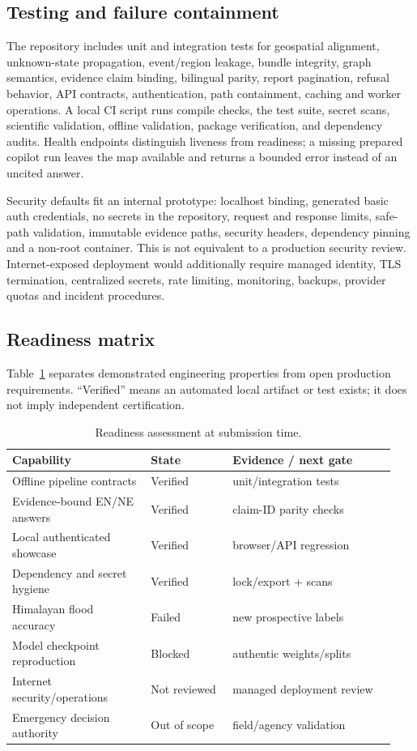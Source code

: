 \documentclass[10pt,twocolumn,letterpaper]{article}
\begin{document}
\subsection{Testing and failure containment}
The repository includes unit and integration tests for geospatial alignment,
unknown-state propagation, event/region leakage, bundle integrity, graph
semantics, evidence claim binding, bilingual parity, report pagination, refusal
behavior, API contracts, authentication, path containment, caching and worker
operations. A local CI script runs compile checks, the test suite, secret scans,
scientific validation, offline validation, package verification, and dependency
audits. Health endpoints distinguish liveness from readiness; a missing prepared
copilot run leaves the map available and returns a bounded error instead of an
uncited answer.

Security defaults fit an internal prototype: localhost binding, generated basic
auth credentials, no secrets in the repository, request and response limits,
safe-path validation, immutable evidence paths, security headers, dependency
pinning and a non-root container. This is not equivalent to a production security
review. Internet-exposed deployment would additionally require managed identity,
TLS termination, centralized secrets, rate limiting, monitoring, backups,
provider quotas and incident procedures.

\subsection{Readiness matrix}
Table~\ref{tab:readiness} separates demonstrated engineering properties from
open production requirements. ``Verified'' means an automated local artifact or
test exists; it does not imply independent certification.

\begin{table}[t]
\centering
\caption{Readiness assessment at submission time.}
\label{tab:readiness}
\small
\setlength{\tabcolsep}{3pt}
\begin{tabular}{@{}p{0.34\linewidth}p{0.20\linewidth}p{0.40\linewidth}@{}}
\toprule
Capability & State & Evidence / next gate \\
\midrule
Offline pipeline contracts & Verified & unit/integration tests \\
Evidence-bound EN/NE answers & Verified & claim-ID parity checks \\
Local authenticated showcase & Verified & browser/API regression \\
Dependency and secret hygiene & Verified & lock/export + scans \\
Himalayan flood accuracy & Failed & new prospective labels \\
Model checkpoint reproduction & Blocked & authentic weights/splits \\
Internet security/operations & Not reviewed & managed deployment review \\
Emergency decision authority & Out of scope & field/agency validation \\
\bottomrule
\end{tabular}
\end{table}
\end{document}
